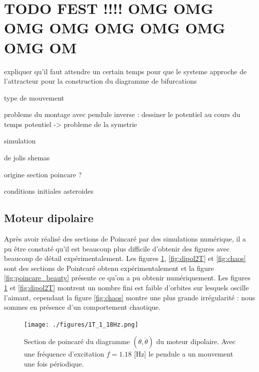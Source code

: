 \documentclass[a4paper,12pt,oneside]{article}
\begin{document}
\clearpage
\section{TODO FEST !!!! OMG OMG OMG OMG OMG OMG OMG OMG OM}


expliquer qu'il faut attendre un certain temps pour que le systeme approche de l'attracteur pour la construction du diagramme de bifurcations

type de mouvement

probleme du montage avec pendule inverse :
dessiner le potentiel au cours du temps
potentiel -> probleme de la symetrie

simulation

de jolis shemas

origine section poincare ?

conditions initiales
asteroides





\subsection{Moteur dipolaire}

Après avoir réalisé des sections de Poincaré par des simulations numérique, il a pu être constaté qu'il est beaucoup plus difficile d'obtenir des figures avec beaucoup de détail expérimentalement. Les figures \ref{fig:dipol1T}, \ref{fig:dipol2T} et \ref{fig:chaos} sont des sections de Pointcaré obtenu expérimentalement et la figure \ref{fig:poincare_beauty} présente ce qu'on a pu obtenir numériquement. Les figures \ref{fig:dipol1T} et \ref{fig:dipol2T} montrent un nombre fini est faible d'orbites sur lesquels oscille l'aimant, cependant la figure \ref{fig:chaos} montre une plus grande irrégularité : nous sommes en présence d'un comportement chaotique.

\begin{figure}[h!]
  \begin{center}
  \texttt{[image: ./figures/1T\_1\_18Hz.png]}
  \caption{Section de poincaré du diagramme $(\theta,\dot{\theta})$ du moteur dipolaire. Avec une fréquence d'excitation $f=1.18$ [Hz] le pendule a un mouvement une fois périodique.} \label{fig:dipol1T}
  \end{center}
\end{figure}
\end{document}
